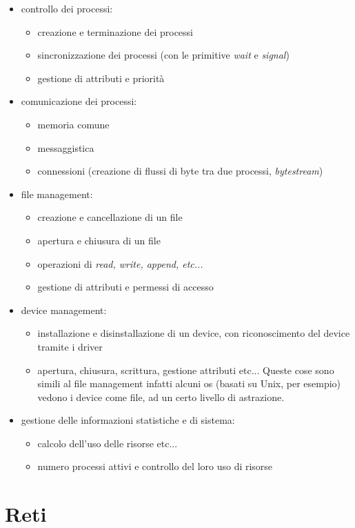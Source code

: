 \documentclass[a4paper,12pt, oneside]{book}
\begin{document}
\begin{itemize}
\item controllo dei processi:
\begin{itemize}
\item creazione e terminazione dei processi
\item sincronizzazione dei processi (con le primitive \textit{wait} e \textit{signal})
\item gestione di attributi e priorità
\end{itemize}
\item comunicazione dei processi:
\begin{itemize}
\item memoria comune
\item messaggistica
\item connessioni (creazione di flussi di byte tra due processi, \textit{bytestream})
\end{itemize}
\item file management:
\begin{itemize}
\item creazione e cancellazione di un file
\item apertura e chiusura di un file
\item operazioni di \textit{read, write, append, etc...}
\item gestione di attributi e permessi di accesso
\end{itemize}
\item device management:
\begin{itemize}
\item installazione e disinstallazione di un device, con riconoscimento del device tramite i driver
\item apertura, chiusura, scrittura, gestione attributi etc... Queste cose sono simili al file management infatti alcuni os (basati su Unix, per esempio) vedono i device come file, ad un certo livello di astrazione.
\end{itemize}
\item gestione delle informazioni statistiche e di sistema:
\begin{itemize}
\item calcolo dell'uso delle risorse etc...
\item numero processi attivi e controllo del loro uso di risorse
\end{itemize}
\end{itemize}
\chapter{Reti}
\end{document}
